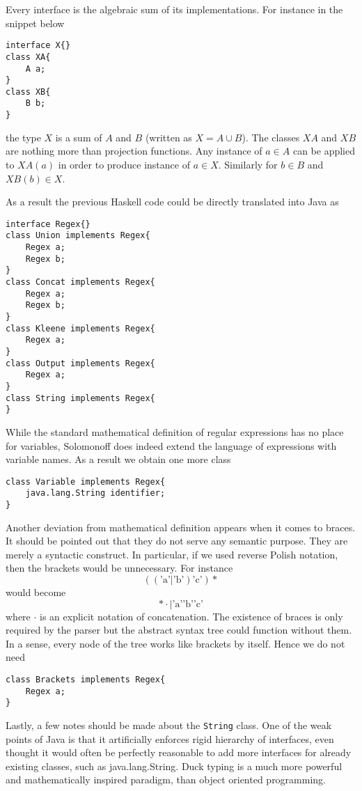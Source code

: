 Every interface is the algebraic sum of its implementations. For instance in the snippet below
\begin{lstlisting}
interface X{}
class XA{
    A a;
}
class XB{
    B b;
}
\end{lstlisting}
the type $X$ is a sum of $A$ and $B$ (written as $X=A \cup B$). The classes $XA$ and $XB$ are nothing more than projection functions. Any instance of $a\in A$ can be applied to $XA(a)$ in order to produce instance of $a\in X$. Similarly for $b\in B$ and $XB(b)\in X$.

As a result the previous Haskell code could be directly translated into Java as
\begin{lstlisting}
interface Regex{}
class Union implements Regex{
    Regex a; 
    Regex b;
}
class Concat implements Regex{
    Regex a;
    Regex b;
}
class Kleene implements Regex{
    Regex a;
}
class Output implements Regex{
    Regex a;
}
class String implements Regex{
}
\end{lstlisting}
While the standard mathematical definition of regular expressions has no place
for variables, Solomonoff does indeed extend the language of expressions with variable names. As a result we obtain one more class
\begin{lstlisting}
class Variable implements Regex{
    java.lang.String identifier;
}
\end{lstlisting}
Another deviation from mathematical definition appears when it comes to braces. It should be pointed out that they do not serve any semantic purpose. They are merely a syntactic construct. In particular, if we used reverse Polish notation, then the brackets would be unnecessary. For instance
\[
((\mbox{'a'}|\mbox{'b'}) \mbox{'c'} )*
\] 
would become
\[
* \cdot | \mbox{'a'} \mbox{'b'} \mbox{'c'}
\] 
where $\cdot$  is an explicit notation of concatenation.
The existence of braces is only required by the parser but the abstract syntax tree could function without them. In a sense, every node of the tree works like brackets by itself. Hence we do not need
\begin{lstlisting}
class Brackets implements Regex{
    Regex a;
}
\end{lstlisting}
Lastly, a few notes should be made about the \texttt{String} class.
One of the weak points of Java
 is that it artificially enforces 
 rigid hierarchy of interfaces,
 even thought it would often be
 perfectly reasonable to
 add more interfaces
 for already existing classes, such as
 java.lang.String. 
 Duck typing is a much more powerful and
 mathematically inspired paradigm, than object oriented programming.
